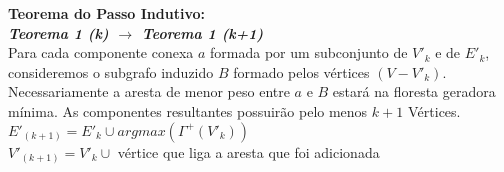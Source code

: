 \documentclass[12pt]{article}
\begin{document}
\textbf{Teorema do Passo Indutivo:}\\

\textit{\textbf{Teorema 1 (k) $\rightarrow$ Teorema 1 (k+1)}}\\
Para cada componente conexa $a$ formada por um subconjunto de $V'_k$ e de $E'_k$, consideremos o subgrafo induzido $B$ formado pelos vértices $\left( V - V'_k \right)$. Necessariamente a aresta de menor peso entre $a$ e $B$ estará na floresta geradora mínima. As componentes resultantes possuirão
pelo menos $k + 1$ Vértices.\\

$E'_{(k+1)} = E'_k \cup {argmax(\Gamma^+(V'_k))}$\\
$V'_{(k+1)} = V'_k \cup$ vértice que liga a aresta que foi adicionada\\
\end{document}
